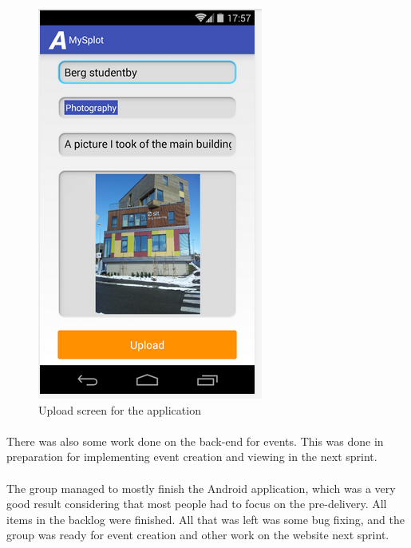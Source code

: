 \begin{figure}
\begin{minipage}{.45\linewidth}
    \includegraphics[width=.8\linewidth]{./Sprint4/img/appUpload.png}
    \caption{Upload screen for the application}
    \label{fig:S4DesignImplAppUpload}
\end{minipage}

\end{figure}

\paragraph{} There was also some work done on the back-end for events. This was done in preparation for implementing event creation and viewing in the next sprint.

\paragraph{} The group managed to mostly finish the Android application, which was a very good result considering that most people had to focus on the pre-delivery. All items in the backlog were finished. All that was left was some bug fixing, and the group was ready for event creation and other work on the website next sprint.

